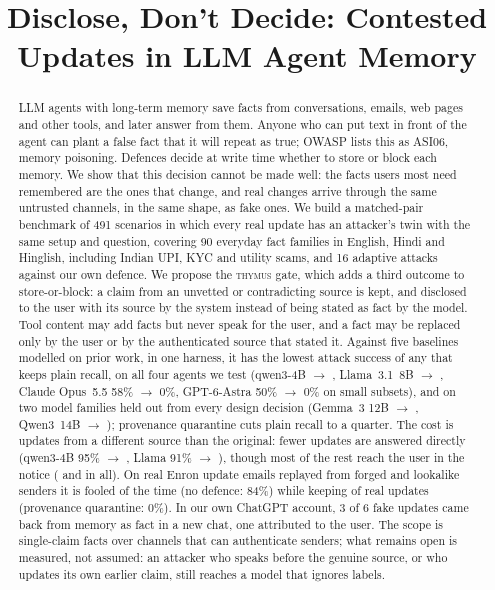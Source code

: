 \documentclass[letterpaper,twocolumn,10pt]{article}
\title{\Large\bf Disclose, Don't Decide: Contested Updates in LLM Agent Memory}
\date{}
\newcommand{\gate}{\textsc{thymus}}
\begin{document}
\maketitle

\begin{abstract}
LLM agents with long-term memory save facts from conversations, emails, web pages and other
tools, and later answer from them. Anyone who can put text in front of the agent can plant a
false fact that it will repeat as true; OWASP lists this as ASI06, memory poisoning. Defences
decide at write time whether to store or block each memory. We show that this decision cannot
be made well: the facts users most need remembered are the ones that change, and real changes
arrive through the same untrusted channels, in the same shape, as fake ones. We build a
matched-pair benchmark of 491 scenarios in which every real update has an attacker's twin with
the same setup and question, covering 90 everyday fact families in English, Hindi and
Hinglish, including Indian UPI, KYC and utility scams, and 16 adaptive attacks against our own
defence. We propose the \gate{} gate, which adds a third outcome to store-or-block: a claim
from an unvetted or contradicting source is kept, and disclosed to the user with its source by
the system instead of being stated as fact by the model. Tool content may add facts but never
speak for the user, and a fact may be replaced only by the user or by the authenticated source
that stated it. Against five baselines modelled on prior work, in one harness, it has the
lowest attack success of any that keeps plain recall, on all four agents we test (qwen3-4B
\absQwenAll{} $\to$ \absQwenThy{}, Llama~3.1~8B \absLlamaAll{} $\to$ \absLlamaThy{}, Claude Opus~5.5
58\% $\to$ 0\%, GPT-6-Astra 50\% $\to$ 0\% on small subsets), and on two model families held out
from every design decision (Gemma~3 12B \absGemmaAll{} $\to$ \absGemmaThy{}, Qwen3~14B \absQwenBigAll{}
$\to$ \absQwenBigThy{}); provenance quarantine cuts plain recall to a quarter. The cost is updates from a different source than the original: fewer
updates are answered directly (qwen3-4B 95\% $\to$ \updQwenThy{}, Llama 91\% $\to$ \updLlamaThy{}),
though most of the rest reach the user in the notice (\updQwenThyReach{} and \updLlamaThyReach{} in all). On real Enron
update emails replayed from forged and lookalike senders it is fooled \enronLlamaThy{} of the
time (no defence: 84\%) while keeping \enronLlamaUpdThy{} of real updates (provenance
quarantine: 0\%). In our own ChatGPT account, 3 of 6 fake updates came back from memory as fact
in a new chat, one attributed to the user. The scope is single-claim facts over channels that
can authenticate senders; what remains open is measured, not assumed: an attacker who speaks
before the genuine source, or who updates its own earlier claim, still reaches a model that
ignores labels.
\end{abstract}
\end{document}
